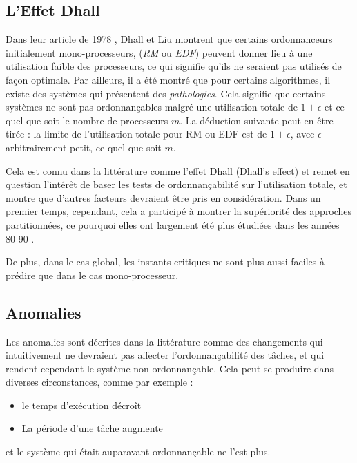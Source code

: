 	\subsection{L'Effet Dhall}
	Dans leur article de 1978 \cite{dhall_real-time_1978}, Dhall et Liu montrent que certains ordonnanceurs 
	initialement mono-processeurs, (\textit{RM} ou \textit{EDF}) peuvent donner lieu à une utilisation faible des 
	processeurs, ce qui signifie qu'ils ne seraient pas utilisés de façon optimale.\medskip 
	Par ailleurs, il a été montré que pour certains algorithmes, 
	il existe des systèmes qui présentent des \textit{pathologies}.
	Cela signifie que certains systèmes ne sont pas ordonnançables malgré une 
	utilisation totale de $1 + \epsilon$ et ce quel que soit le nombre de processeurs $m$.
	La déduction suivante peut en être tirée : la limite de l'utilisation totale 
	pour RM ou EDF est de $1 + \epsilon$, avec $\epsilon$ arbitrairement petit, ce 
	quel que soit $m$. \newline
	
	Cela est connu dans la littérature comme l'\og effet Dhall\fg{}  (Dhall's effect) et remet en 
	question l'intérêt de baser les tests de ordonnançabilité sur l'utilisation totale, et 
	montre que d'autres facteurs devraient être pris en considération. Dans un premier temps, cependant, 
	cela a participé à montrer la supériorité des approches partitionnées, ce pourquoi elles ont 
	largement été plus étudiées dans les années 80-90 \cite{davis_survey_2011}.\newline
	
	De plus, dans le cas global, les instants critiques ne sont plus aussi faciles à prédire 
	que dans le cas mono-processeur. \newline
	
	\subsection{Anomalies}
	Les anomalies sont décrites dans la littérature comme des changements qui intuitivement ne devraient 
	pas affecter l'ordonnançabilité des tâches, et qui rendent cependant le système non-ordonnançable. 
	Cela peut se produire dans diverses circonstances, comme par exemple :\medskip
	\begin{itemize}
		\item le temps d'exécution décroît
		\item La période d'une tâche augmente
	\end{itemize}
	et le système qui était auparavant ordonnançable ne l'est plus.
	

